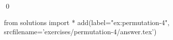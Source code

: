 
\begin{ex} 
  \label{ex:permutation-4}
  
  \qed
\end{ex} 
\begin{python0}
from solutions import *
add(label="ex:permutation-4",
    srcfilename='exercises/permutation-4/answer.tex') 
\end{python0}
